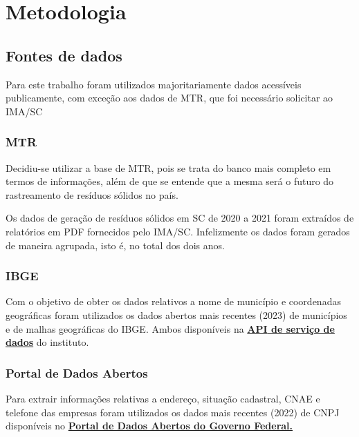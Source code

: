 \chapter{Metodologia}

\section{Fontes de dados}\label{section:Fontes}

Para este trabalho foram utilizados majoritariamente dados acessíveis publicamente, com exceção aos dados de \gls{MTR}, que foi necessário solicitar ao \gls{IMA/SC}

\subsection{MTR}

Decidiu-se utilizar a base de MTR, pois se trata do banco mais completo em termos de informações, além de que se entende que a mesma será o futuro do rastreamento de resíduos sólidos no país.

Os dados de geração de resíduos sólidos em \gls{SC} de 2020 a 2021 foram extraídos de relatórios em \gls{PDF} fornecidos pelo \gls{IMA/SC}. Infelizmente os dados foram gerados de maneira agrupada, isto é, no total dos dois anos.

\subsection{IBGE}

Com o objetivo de obter os dados relativos a nome de município e coordenadas geográficas foram utilizados os dados abertos mais recentes (2023) de municípios e de malhas geográficas do \gls{IBGE}. Ambos disponíveis na \href{https://servicodados.ibge.gov.br/api/docs/}{\textbf{\gls{API} de serviço de dados}} do instituto.

\subsection{Portal de Dados Abertos}

Para extrair informações relativas a endereço, situação cadastral, \gls{CNAE} e telefone das empresas foram utilizados os dados mais recentes (2022) de \gls{CNPJ} disponíveis no \href{https://dados.gov.br/dados/conjuntos-dados/cadastro-nacional-da-pessoa-juridica---cnpj}{\textbf{Portal de Dados Abertos do Governo Federal.}}

